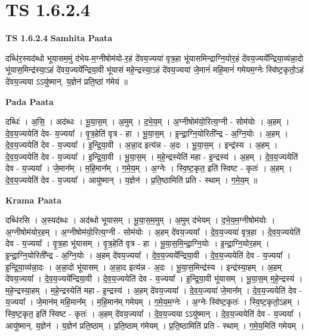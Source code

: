 \documentclass[17pt]{extarticle}
\begin{document}
\section*{ TS 1.6.2.4 }

\textbf{TS 1.6.2.4 } \newline
\textbf{Samhita Paata} \newline

दब्धि॑र॒स्यद॑ब्धो भूयासम॒मुं द॑भेय-म॒ग्नीषोम॑यो-र॒हं दे॑वय॒ज्यया॑ वृत्र॒हा भू॑यासमिन्द्राग्नि॒योर॒हं दे॑वय॒ज्यये᳚न्द्रिया॒व्य॑न्ना॒दो भू॑यास॒मिन्द्र॑स्या॒ऽहं दे॑वय॒ज्यये᳚न्द्रिया॒वी भू॑यासं महे॒न्द्रस्या॒ऽहं दे॑वय॒ज्यया॑ जे॒मानं॑ महि॒मानं॑ गमेयम॒ग्नेः स्वि॑ष्ट॒कृतो॒ऽहं दे॑वय॒ज्यया ऽऽयु॑ष्मान्. य॒ज्ञेन॑ प्रति॒ष्ठां ग॑मेयं ॥ \newline

\textbf{Pada Paata} \newline

दब्धिः॑ । अ॒सि॒ । अद॑ब्धः । भू॒या॒स॒म् । अ॒मुम् । द॒भे॒य॒म् । अ॒ग्नीषोम॑यो॒रित्य॒ग्नी - सोम॑योः । अ॒हम् । दे॒व॒य॒ज्ययेति॑ देव- य॒ज्यया᳚ । वृ॒त्र॒हेति॑ वृत्र - हा । भू॒या॒स॒म् । इ॒न्द्रा॒ग्नि॒योरिती᳚न्द्र - अ॒ग्नि॒योः । अ॒हम् । दे॒व॒य॒ज्ययेति॑ देव - य॒ज्यया᳚ । इ॒न्द्रि॒या॒वी । अ॒न्ना॒द इत्य॑न्न - अ॒दः । भू॒या॒स॒म् । इन्द्र॑स्य । अ॒हम् । दे॒व॒य॒ज्ययेति॑ देव - य॒ज्यया᳚ । इ॒न्द्रि॒या॒वी । भू॒या॒स॒म् । म॒हे॒न्द्रस्येति॑ महा - इ॒न्द्रस्य॑ । अ॒हम् । दे॒व॒य॒ज्ययेति॑ देव - य॒ज्यया᳚ । जे॒मान᳚म् । म॒हि॒मान᳚म् । ग॒मे॒य॒म् । अ॒ग्नेः । स्वि॒ष्ट॒कृत॒ इति॑ स्विष्ट - कृतः॑ । अ॒हम् । दे॒व॒य॒ज्ययेति॑ देव - य॒ज्यया᳚ । आयु॑ष्मान् । य॒ज्ञेन॑ । प्र॒ति॒ष्ठामिति॑ प्रति - स्थाम् । ग॒मे॒य॒म् ॥  \newline


\textbf{Krama Paata} \newline

दब्धि॑रसि । अ॒स्यद॑ब्धः । अद॑ब्धो भूयासम् । भू॒या॒स॒म॒मुम् । अ॒मुम् द॑भेयम् । द॒भे॒य॒म॒ग्नीषोम॑योः । अ॒ग्नीषोम॑योर॒हम् । अ॒ग्नीषोम॑यो॒रित्य॒ग्नी - सोम॑योः । अ॒हम् दे॑वय॒ज्यया᳚ । दे॒व॒य॒ज्यया॑ वृत्र॒हा । दे॒व॒य॒ज्ययेति॑ देव - य॒ज्यया᳚ । वृ॒त्र॒हा भू॑यासम् । वृ॒त्र॒हेति॑ वृत्र - हा । भू॒या॒स॒मि॒न्द्रा॒ग्नि॒योः । इ॒न्द्रा॒ग्नि॒योर॒हम् । इ॒न्द्रा॒ग्नि॒योरिती᳚न्द्र - अ॒ग्नि॒योः । अ॒हम् दे॑वय॒ज्यया᳚ । दे॒व॒य॒ज्यये᳚न्द्रिया॒वी । दे॒व॒य॒ज्ययेति॑ देव - य॒ज्यया᳚ । इ॒न्द्रि॒या॒व्य॑न्ना॒दः । अ॒न्ना॒दो भू॑यासम् । अ॒न्ना॒द इत्य॑न्न - अ॒दः । भू॒या॒स॒मिन्द्र॑स्य । इन्द्र॑स्या॒हम् । अ॒हम् दे॑वय॒ज्यया᳚ । दे॒व॒य॒ज्यये᳚न्द्रिया॒वी । दे॒व॒य॒ज्ययेति॑ देव - य॒ज्यया᳚ । इ॒न्द्रि॒या॒वी भू॑यासम् । भू॒या॒स॒म् म॒हे॒न्द्रस्य॑ । म॒हे॒न्द्रस्या॒हम् । म॒हे॒न्द्रस्येति॑ महा - इ॒न्द्रस्य॑ । अ॒हम् दे॑वय॒ज्यया᳚ । दे॒व॒य॒ज्यया॑ जे॒मान᳚म् । दे॒व॒य॒ज्ययेति॑ देव - य॒ज्यया᳚ । जे॒मान॑म् महि॒मान᳚म् । म॒हि॒मान॑म् गमेयम् । ग॒मे॒य॒म॒ग्नेः । अ॒ग्नेः स्वि॑ष्ट॒कृतः॑ । स्वि॒ष्ट॒कृतो॒ऽहम् । स्वि॒ष्ट॒कृत॒ इति॑ स्विष्ट - कृतः॑ । अ॒हम् दे॑वय॒ज्यया᳚ । दे॒व॒य॒ज्यया ऽऽयु॑ष्मान् । दे॒व॒य॒ज्ययेति॑ देव - य॒ज्यया᳚ । आयु॑ष्मान्. य॒ज्ञेन॑ । य॒ज्ञेन॑ प्रति॒ष्ठाम् । प्र॒ति॒ष्ठाम् ग॑मेयम् । प्र॒ति॒ष्ठामिति॑ प्रति - स्थाम् । ग॒मे॒य॒मिति॑ गमेयम् । \newline
\end{document}
